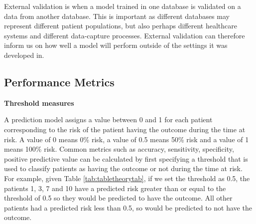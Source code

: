 \documentclass[11pt]{book}
\theoremstyle{definition}
\theoremstyle{definition}
\theoremstyle{definition}
\theoremstyle{remark}
\begin{document}
External validation is when a model trained in one database is validated on a data from another database. This is important as different databases may represent different patient populations, but also perhaps different healthcare systems and different data-capture processes. External validation can therefore inform us on how well a model will perform outside of the settings it was developed in.

\hypertarget{performance}{%
\subsection{Performance Metrics}\label{performance}}

\textbf{Threshold measures}

A prediction model assigns a value between 0 and 1 for each patient corresponding to the risk of the patient having the outcome during the time at risk. A value of 0 means 0\% risk, a value of 0.5 means 50\% risk and a value of 1 means 100\% risk. Common metrics such as accuracy, sensitivity, specificity, positive predictive value can be calculated by first specifying a threshold that is used to classify patients as having the outcome or not during the time at risk. For example, given Table \ref{tab:tabletheorytab}, if we set the threshold as 0.5, the patients 1, 3, 7 and 10 have a predicted risk greater than or equal to the threshold of 0.5 so they would be predicted to have the outcome. All other patients had a predicted risk less than 0.5, so would be predicted to not have the outcome.
\end{document}
